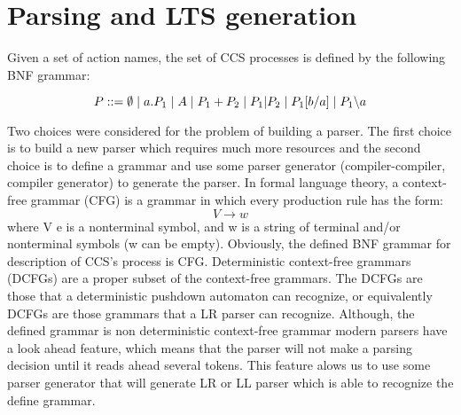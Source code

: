 \section{Parsing and LTS generation}

Given a set of action names, the set of CCS processes is defined by the following BNF grammar:

\begin{equation}\label{eq:ccs_bnf}
P ::= \emptyset \hspace{1 mm} | \hspace{1 mm} a.P_{1} \hspace{1 mm} | \hspace{1 mm} A \hspace{1 mm} | \hspace{1 mm}P_{1}+P_{2} \hspace{1 mm} |
\hspace{1 mm} P_{1} | P_{2} \hspace{1 mm} | \hspace{1 mm} P_{1}[b/a] \hspace{1 mm} | \hspace{1 mm} P_{1} \backslash a
\end{equation}

Two choices were considered for the problem of building a parser. The first choice is to build
a new parser which requires much more resources and the second choice is to define a grammar
and use some parser generator (compiler-compiler, compiler generator) to generate the parser.
In formal language theory, a context-free grammar (CFG) is a grammar in which every production 
rule has the form:
\[V \rightarrow w \]
where V e is a nonterminal symbol, and w is a string of terminal and/or nonterminal symbols 
(w can be empty). Obviously, the defined BNF grammar for description of CCS's process is CFG. 
Deterministic context-free grammars (DCFGs) are a proper subset of the context-free grammars.
The DCFGs are those that a deterministic pushdown automaton can recognize, or equivalently DCFGs
are those grammars that a LR parser can recognize. Although, the defined grammar is non 
deterministic context-free grammar modern parsers have a look ahead feature, which means that
the parser will not make a parsing decision until it reads ahead several tokens. This feature
alows us to use some parser generator that will generate LR or LL parser which is able to
recognize the define grammar.

